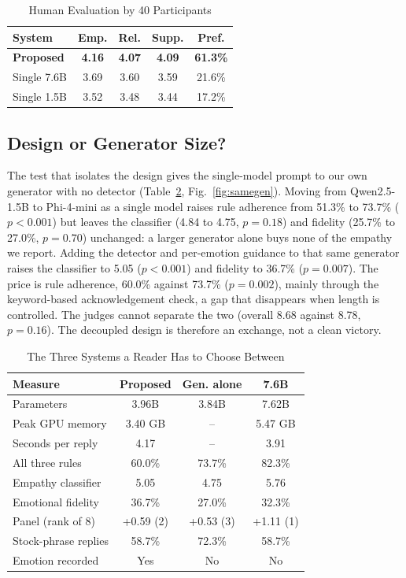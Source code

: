 \begin{table}[htbp]
\caption{Human Evaluation by 40 Participants}
\begin{center}
\begin{tabular}{|l|c|c|c|c|}
\hline
\textbf{System} & \textbf{Emp.} & \textbf{Rel.} & \textbf{Supp.} & \textbf{Pref.} \\
\hline
\textbf{Proposed} & \textbf{4.16} & \textbf{4.07} & \textbf{4.09} & \textbf{61.3\%} \\
Single 7.6B & 3.69 & 3.60 & 3.59 & 21.6\% \\
Single 1.5B & 3.52 & 3.48 & 3.44 & 17.2\% \\
\hline
\end{tabular}
\label{tab:human}
\end{center}
\end{table}

\subsection{Design or Generator Size?}
The test that isolates the design gives the single-model prompt to our own generator with no detector (Table~\ref{tab:three}, Fig.~\ref{fig:samegen}). Moving from Qwen2.5-1.5B to Phi-4-mini as a single model raises rule adherence from 51.3\% to 73.7\% ($p<0.001$) but leaves the classifier (4.84 to 4.75, $p=0.18$) and fidelity (25.7\% to 27.0\%, $p=0.70$) unchanged: a larger generator alone buys none of the empathy we report. Adding the detector and per-emotion guidance to that same generator raises the classifier to 5.05 ($p<0.001$) and fidelity to 36.7\% ($p=0.007$). The price is rule adherence, 60.0\% against 73.7\% ($p=0.002$), mainly through the keyword-based acknowledgement check, a gap that disappears when length is controlled. The judges cannot separate the two (overall 8.68 against 8.78, $p=0.16$). The decoupled design is therefore an exchange, not a clean victory.

\begin{table}[htbp]
\caption{The Three Systems a Reader Has to Choose Between}
\begin{center}
\begin{tabular}{|l|c|c|c|}
\hline
\textbf{Measure} & \textbf{Proposed} & \textbf{Gen. alone} & \textbf{7.6B} \\
\hline
Parameters & 3.96B & 3.84B & 7.62B \\
Peak GPU memory & 3.40 GB & -- & 5.47 GB \\
Seconds per reply & 4.17 & -- & 3.91 \\
All three rules & 60.0\% & 73.7\% & 82.3\% \\
Empathy classifier & 5.05 & 4.75 & 5.76 \\
Emotional fidelity & 36.7\% & 27.0\% & 32.3\% \\
Panel (rank of 8) & +0.59 (2) & +0.53 (3) & +1.11 (1) \\
Stock-phrase replies & 58.7\% & 72.3\% & 58.7\% \\
Emotion recorded & Yes & No & No \\
\hline
\end{tabular}
\label{tab:three}
\end{center}
\end{table}

